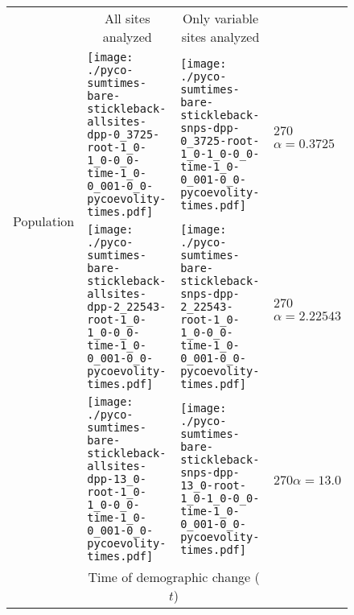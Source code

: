 \documentclass[border=10pt,varwidth=30cm]{standalone}
\begin{document}
\begin{figure}
    \centering
    \begin{tabular}{@{}llll@{}}
        & \multicolumn{1}{c}{All sites analyzed} & \multicolumn{1}{c}{Only variable sites analyzed} & \\
        \multirow{2}{*}[2em]{\begin{sideways}\large Population\end{sideways}}
        & \texttt{[image: ./pyco-sumtimes-bare-stickleback-allsites-dpp-0\_3725-root-1\_0-1\_0-0\_0-time-1\_0-0\_001-0\_0-pycoevolity-times.pdf]}
        & \texttt{[image: ./pyco-sumtimes-bare-stickleback-snps-dpp-0\_3725-root-1\_0-1\_0-0\_0-time-1\_0-0\_001-0\_0-pycoevolity-times.pdf]}
        & \multirow{1}{*}[11.5em]{\begin{rotate}{270}$\alpha = 0.3725$\end{rotate}} \\
        & \texttt{[image: ./pyco-sumtimes-bare-stickleback-allsites-dpp-2\_22543-root-1\_0-1\_0-0\_0-time-1\_0-0\_001-0\_0-pycoevolity-times.pdf]}
        & \texttt{[image: ./pyco-sumtimes-bare-stickleback-snps-dpp-2\_22543-root-1\_0-1\_0-0\_0-time-1\_0-0\_001-0\_0-pycoevolity-times.pdf]}
        & \multirow{1}{*}[11.5em]{\begin{rotate}{270}$\alpha = 2.22543$\end{rotate}} \\
        & \texttt{[image: ./pyco-sumtimes-bare-stickleback-allsites-dpp-13\_0-root-1\_0-1\_0-0\_0-time-1\_0-0\_001-0\_0-pycoevolity-times.pdf]}
        & \texttt{[image: ./pyco-sumtimes-bare-stickleback-snps-dpp-13\_0-root-1\_0-1\_0-0\_0-time-1\_0-0\_001-0\_0-pycoevolity-times.pdf]}
        & \multirow{1}{*}[11.5em]{\begin{rotate}{270}$\alpha = 13.0$\end{rotate}} \\
        & \multicolumn{2}{c}{\large Time of demographic change ($t$)} & 
    \end{tabular}
\end{figure}
\end{document}
